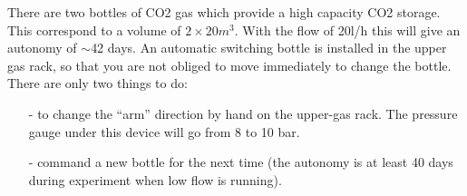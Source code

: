 \documentclass[12pt]{article}
\begin{document}
There are two bottles of CO2 gas which provide a high capacity CO2 
storage. This correspond to a volume 
of $2\times 20m^3$. With the flow of 20l/h  this will give an autonomy 
of $\sim$42 days. An automatic switching
bottle is installed in the upper gas rack, so that you are not obliged to 
move immediately to change the bottle. There are only two things to do:
\begin{itemize}
\item[-] to change the ``arm'' direction by hand on the upper-gas rack. The
pressure gauge under this device will go from 8 to 10 bar. 
\item[-] command a new bottle for the next time (the autonomy is 
at least 40 days during experiment when low flow is running).
\end{itemize} 
\end{document}
